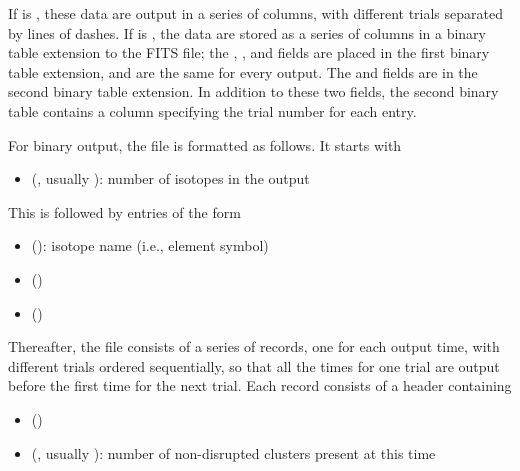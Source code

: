 \documentclass[letterpaper,10pt,english]{sphinxmanual}
\begin{document}
If  is , these data are output in a series of
columns, with different trials separated by lines of dashes. If
 is , the data are stored as a series of
columns in a binary table extension to the FITS file; the ,
, and  fields are placed in the first binary table
extension, and are the same for every output. The  and
 fields are in the second binary table extension. In
addition to these two fields, the second binary table contains a
column specifying the trial number for each entry.

For binary output, the file is formatted as follows. It starts with
\begin{itemize}
\item {} 
 (, usually ): number of isotopes in the output

\end{itemize}

This is followed by  entries of the form
\begin{itemize}
\item {} 
 (): isotope name (i.e., element symbol)

\item {} 
 ()

\item {} 
 ()

\end{itemize}

Thereafter, the file consists of a series of records, one for each output time, with different trials ordered sequentially, so that all the times for one trial are output before the first time for the next trial. Each record consists of a header containing
\begin{itemize}
\item {} 
 ()

\item {} 
 (, usually ): number of non-disrupted clusters present at this time

\end{itemize}
\end{document}
